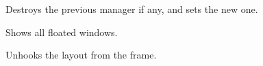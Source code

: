 \label{wxframelayoutsetupdatesmanager}


Destroys the previous manager if any, and sets the new one.


\label{wxframelayoutshowfloatedwindows}


Shows all floated windows.


\label{wxframelayoutunhookfromframe}


Unhooks the layout from the frame.

